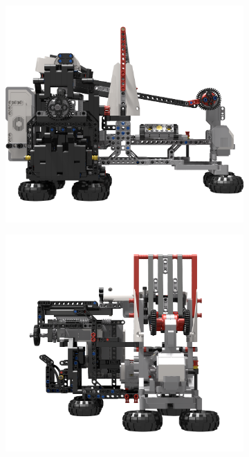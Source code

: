 \documentclass{report}
\begin{document}
\begin{figure}[H]
\begin{subfigure}[b]{0.275\textwidth}
    		\caption{}
    		\label{fig:rdrMkIIElevation2}
    	\end{subfigure}
    	\hspace{10mm}
    	\begin{subfigure}[b]{0.275\textwidth}
    		\includegraphics[width=\textwidth]{Resources/Images/rdrMkIIElevation3.png}
    		\caption{}
    		\label{fig:rdrMkIIElevation3}
    	\end{subfigure}
    	\begin{subfigure}[b]{0.275\textwidth}
    		\includegraphics[width=\textwidth]{Resources/Images/rdrMkIIElevation4.png}

\end{subfigure}
\end{figure}
\end{document}

